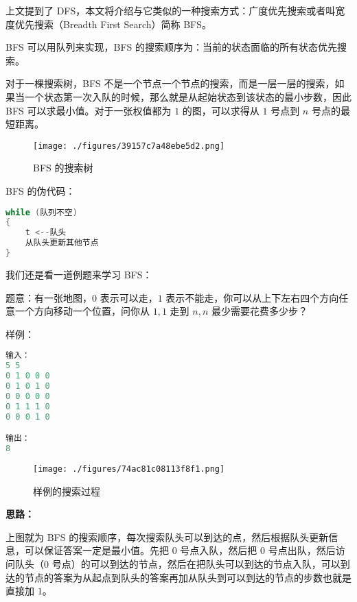 

上文提到了 DFS，本文将介绍与它类似的一种搜索方式：广度优先搜索或者叫宽度优先搜索（Breadth First Search）简称 BFS。

BFS 可以用队列来实现，BFS 的搜索顺序为：当前的状态面临的所有状态优先搜索。

对于一棵搜索树，BFS 不是一个节点一个节点的搜索，而是一层一层的搜索，如果当一个状态第一次入队的时候，那么就是从起始状态到该状态的最小步数，因此 BFS 可以求最小值。对于一张权值都为 $1$ 的图，可以求得从 $1$ 号点到 $n$ 号点的最短距离。

\begin{figure}[ht]
\centering
\texttt{[image: ./figures/39157c7a48ebe5d2.png]}
\caption{BFS 的搜索树} \label{fig_BFS_1}
\end{figure}


BFS 的伪代码：\begin{lstlisting}[language=cpp]
while (队列不空) 
{
    t <--队头
    从队头更新其他节点
}
\end{lstlisting}

我们还是看一道例题来学习 BFS：

题意：有一张地图，$0$ 表示可以走，$1$ 表示不能走，你可以从上下左右四个方向任意一个方向移动一个位置，问你从 $1,1$ 走到 $n,n$ 最少需要花费多少步？

样例：\begin{lstlisting}[language=cpp]
输入：
5 5
0 1 0 0 0
0 1 0 1 0
0 0 0 0 0
0 1 1 1 0
0 0 0 1 0

输出：
8
\end{lstlisting}
\begin{figure}[ht]
\centering
\texttt{[image: ./figures/74ac81c08113f8f1.png]}
\caption{样例的搜索过程} \label{fig_BFS_2}
\end{figure}

\textbf{思路：}

上图就为 BFS 的搜索顺序，每次搜索队头可以到达的点，然后根据队头更新信息，可以保证答案一定是最小值。先把 $0$ 号点入队，然后把 $0$ 号点出队，然后访问队头（$0$ 号点）的可以到达的节点，然后在把队头可以到达的节点入队，可以到达的节点的答案为从起点到队头的答案再加从队头到可以到达的节点的步数也就是直接加 $1$。

